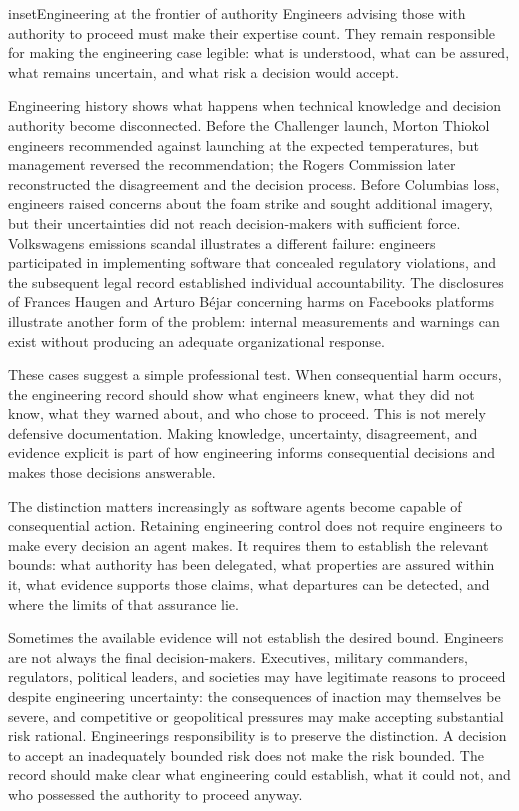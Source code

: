 \begin{bookbox}{inset}{Engineering at the frontier of authority}
\label{inset-frontier-authority}
Engineers advising those with authority to proceed must make their expertise count. They remain responsible for making the engineering case legible: what is understood, what can be assured, what remains uncertain, and what risk a decision would accept.

Engineering history shows what happens when technical knowledge and decision authority become disconnected. Before the Challenger launch, Morton Thiokol engineers recommended against launching at the expected temperatures, but management reversed the recommendation; the Rogers Commission later reconstructed the disagreement and the decision process\citep{rogers1986}. Before Columbia\textquotesingle s loss, engineers raised concerns about the foam strike and sought additional imagery, but their uncertainties did not reach decision-makers with sufficient force\citep{caib2003}. Volkswagen\textquotesingle s emissions scandal illustrates a different failure: engineers participated in implementing software that concealed regulatory violations, and the subsequent legal record established individual accountability\citep{doj-vw-liang}. The disclosures of Frances Haugen and Arturo Béjar concerning harms on Facebook\textquotesingle s platforms illustrate another form of the problem: internal measurements and warnings can exist without producing an adequate organizational response\citep{senate-haugen2021, senate-bejar2023}.

These cases suggest a simple professional test. When consequential harm occurs, the engineering record should show what engineers knew, what they did not know, what they warned about, and who chose to proceed. This is not merely defensive documentation. Making knowledge, uncertainty, disagreement, and evidence explicit is part of how engineering informs consequential decisions and makes those decisions answerable.

The distinction matters increasingly as software agents become capable of consequential action. Retaining engineering control does not require engineers to make every decision an agent makes. It requires them to establish the relevant bounds: what authority has been delegated, what properties are assured within it, what evidence supports those claims, what departures can be detected, and where the limits of that assurance lie.

Sometimes the available evidence will not establish the desired bound. Engineers are not always the final decision-makers. Executives, military commanders, regulators, political leaders, and societies may have legitimate reasons to proceed despite engineering uncertainty: the consequences of inaction may themselves be severe, and competitive or geopolitical pressures may make accepting substantial risk rational. Engineering\textquotesingle s responsibility is to preserve the distinction. A decision to accept an inadequately bounded risk does not make the risk bounded. The record should make clear what engineering could establish, what it could not, and who possessed the authority to proceed anyway.


\end{bookbox}
